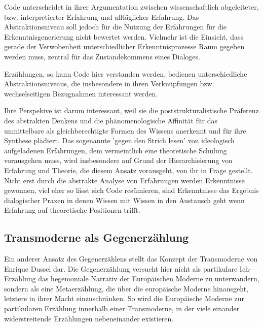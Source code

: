 Code unterscheidet in ihrer Argumentation zwischen wissenschaftlich
abgeleiteter, bzw. interpretierter Erfahrung und alltäglicher Erfahrung. Das
Abstraktionsniveau soll jedoch für die Nutzung der Erfahrungen für die
Erkenntnisgenerierung nicht bewertet werden. Vielmehr ist die Einsicht, dass
gerade der Verwobenheit unterschiedlicher Erkenntnisprozesse Raum gegeben werden
muss, zentral für das Zustandekommens eines Dialoges.\footnotemark
{}

Erzählungen, so kann Code hier verstanden werden, bedienen unterschiedliche
Abstraktionsniveaus, die insbesondere in ihren Verknüpfungen bzw.
wechselseitigen Bezugnahmen interessant werden.

Ihre Perspekive ist darum interessant, weil sie die poststrukturalistische
Präferenz des abstrakten Denkens und die phänomenologische Affinität für das
unmittelbare als gleichberechtigte Formen des Wissens anerkennt und für ihre
Synthese plädiert. Das sogenannte 'gegen den Strich lesen' von ideologisch
aufgeladenen Erfahrungen, dem vermeintlich eine theoretische Schulung
vorausgehen muss, wird insbesondere auf Grund der Hierarchisierung von Erfahrung
und Theorie, die diesem Ansatz vorausgeht, von ihr in Frage gestellt. Nicht erst
durch die abstrakte Analyse von  Erfahrungen werden Erkenntnisse gewonnen, viel
eher so lässt sich Code resümieren, sind Erkenntnisse das Ergebnis dialogischer
Praxen in denen Wissen mit Wissen in den Austausch geht wenn Erfahrung auf
theoretische Positionen trifft.

\subsection{Transmoderne als Gegenerzählung}

Ein anderer Ansatz des Gegenerzählens stellt das Konzept der Transmoderne von
Enrique Dussel dar. Die Gegenerzählung versucht hier nicht als partikulare
Ich-Erzählung das hegemoniale Narrativ der Europäischen Moderne zu unterwandern,
sondern als eine Metaerzählung, die über die europäische Moderne hinausgeht,
letztere in ihrer Macht einzuschränken. So wird die Europäische Moderne zur
partikularen Erzählung innerhalb einer Transmoderne, in der viele einander
widerstreitende Erzählungen nebeneinander existieren.

